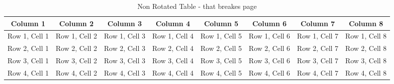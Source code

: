 \documentclass[../../../main.tex]{subfiles}
\begin{document}
\begin{table}[ht]
    \centering
    \caption{Non Rotated Table - that breakes page}
    \begin{tabular}{|c|c|c|c|c|c|c|c|}
        \hline
        \rowcolor[HTML]{C0C0C0} 
        \textbf{Column 1} & \textbf{Column 2} & \textbf{Column 3} & \textbf{Column 4}  & \textbf{Column 5}  & \textbf{Column 6} & \textbf{Column 7}  & \textbf{Column 8} \\ \hline
        Row 1, Cell 1  & Row 1, Cell 2  & Row 1, Cell 3  & Row 1, Cell 4 & Row 1, Cell 5 & Row 1, Cell 6 & Row 1, Cell 7 & Row 1, Cell 8   \\ \hline
        Row 2, Cell 1  & Row 2, Cell 2  & Row 2, Cell 3  & Row 2, Cell 4 & Row 2, Cell 5 & Row 2, Cell 6 & Row 2, Cell 7 & Row 2, Cell 8   \\ \hline
        Row 3, Cell 1  & Row 3, Cell 2  & Row 3, Cell 3  & Row 3, Cell 4 & Row 3, Cell 5 & Row 3, Cell 6 & Row 3, Cell 7 & Row 3, Cell 8  \\ \hline
        Row 4, Cell 1  & Row 4, Cell 2  & Row 4, Cell 3  & Row 4, Cell 4 & Row 4, Cell 5 & Row 4, Cell 6 & Row 4, Cell 7 & Row 4, Cell 8   \\ \hline
    \end{tabular}
\end{table}






\FloatBarrier %




\end{document}
